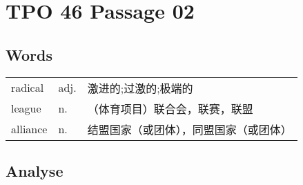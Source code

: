\section{TPO 46 Passage 02}

\subsection{Words}

\begin{tabular}{lll}
    radical  & adj. & 激进的;过激的;极端的         \\
    league   & n.   & （体育项目）联合会，联赛，联盟     \\
    alliance & n.   & 结盟国家（或团体），同盟国家（或团体） \\
\end{tabular}

\subsection{Analyse}

